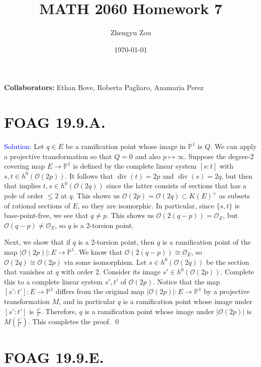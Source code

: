 \documentclass[11pt]{article}
\title{MATH 2060 Homework 7}
\author{Zhengyu Zou}
\date{\today}
\newcommand{\PP}{\mathbb{P}}
\newcommand{\cO}{\mathcal{O}}
\newcommand{\Div}{\operatorname{div}}
\newenvironment{solution}{\begin{trivlist}\item[]{\textcolor{blue}{Solution:}}}{\qed \end{trivlist}}
\begin{document}
\maketitle

\textbf{Collaborators:} Ethan Bove, Roberta Pagliaro, Anamaria Perez

\section*{FOAG 19.9.A.}

\begin{solution}
	Let $q \in E$ be a ramification point whose image in $\PP^1$ is $Q$. We can apply a projective transformation so that $Q = 0$ and also $p \mapsto \infty$. Suppose the degree-2 covering map $E \rightarrow \PP^1$ is defined by the complete linear system $[s:t]$ with $s, t \in h^0(\cO(2p))$. It follows that $\Div(t) = 2p$ and $\Div(s) = 2q$, but then that implies $t, s \in h^0(\cO(2q))$ since the latter consists of sections that has a pole of order $\leq 2$ at $q$. This shows us $\cO(2p) = \cO(2q) \subset K(E)^\times$ as subsets of rational sections of $E$, so they are isomorphic. In particular, since $\{s, t\}$ is base-point-free, we see that $q \neq p$. This shows us $\cO(2(q-p)) = \cO_E$, but $\cO(q-p) \neq \cO_E$, so $q$ is a 2-torsion point. 

	Next, we show that if $q$ is a 2-torsion point, then $q$ is a ramification point of the map $|\cO(2p)|: E \rightarrow \PP^1$. We know that $\cO(2(q-p)) \cong \cO_E$, so $\cO(2q) \cong \cO(2p)$ via some isomorphism. Let $s \in h^0(\cO(2q))$ be the section that vanishes at $q$ with order 2. Consider its image $s' \in h^0(\cO(2p))$. Complete this to a complete linear system $s', t'$ of $\cO(2p)$. Notice that the map $[s':t']: E \rightarrow \PP^1$ differs from the original map $|\cO(2p)|: E \rightarrow \PP^1$ by a projective transformation $M$, and in particular $q$ is a ramification point whose image under $[s':t']$ is $\frac{s'}{t'}$. Therefore, $q$ is a ramification point whose image under $|\cO(2p)|$ is $M(\frac{s'}{t'})$. This completes the proof. 
\end{solution}

\newpage

\section*{FOAG 19.9.E.}
\end{document}
